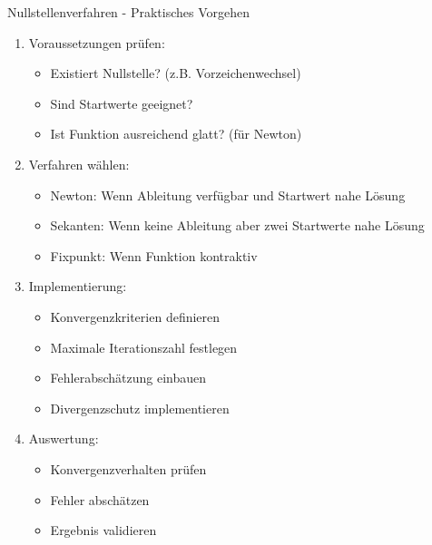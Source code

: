 \begin{KR}{Nullstellenverfahren - Praktisches Vorgehen}
\begin{enumerate}
    \item Voraussetzungen prüfen:
    \begin{itemize}
        \item Existiert Nullstelle? (z.B. Vorzeichenwechsel)
        \item Sind Startwerte geeignet?
        \item Ist Funktion ausreichend glatt? (für Newton)
    \end{itemize}
    
    \item Verfahren wählen:
    \begin{itemize}
        \item Newton: Wenn Ableitung verfügbar und Startwert nahe Lösung
        \item Sekanten: Wenn keine Ableitung aber zwei Startwerte nahe Lösung
        \item Fixpunkt: Wenn Funktion kontraktiv
    \end{itemize}
    
    \item Implementierung:
    \begin{itemize}
        \item Konvergenzkriterien definieren
        \item Maximale Iterationszahl festlegen
        \item Fehlerabschätzung einbauen
        \item Divergenzschutz implementieren
    \end{itemize}
    
    \item Auswertung:
    \begin{itemize}
        \item Konvergenzverhalten prüfen
        \item Fehler abschätzen
        \item Ergebnis validieren
    \end{itemize}
\end{enumerate}
\end{KR}

